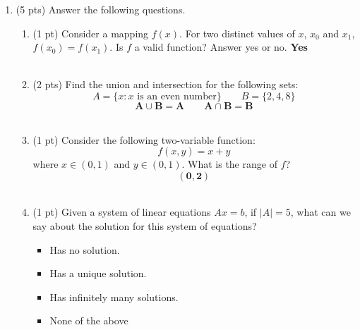 \documentclass{./../../latex/tests}
\begin{document}
\thispagestyle{plain}

\vspace{0.5em}

\begin{enumerate}
\item (5 pts) Answer the following questions. 
\begin{enumerate}
\item (1 pt) Consider a mapping $f(x)$. For two distinct values of $x$, $x_0$ and $x_1$, $f(x_0) = f(x_1)$. Is $f$ a valid function? Answer yes or no. \textbf{Yes} \\~\\
\item (2 pts) Find the union and intersection for the following sets:
\[ A = \{x: x \text{ is an even number} \} \quad \quad B = \{2, 4, 8 \} \] 
\[\mathbf{ A \cup B = A \quad \quad A \cap B = B }\] \\
\item (1 pt) Consider the following two-variable function: 
  \[ f(x,y) = x+y \]
  where $x \in (0,1)$ and $y \in (0,1)$. What is the range of $f$? \[\mathbf{(0,2)}\] \\
 
\item (1 pt) Given a system of linear equations $A x = b$, if $|A|=5$, what can we say about the solution for this system of equations?
\begin{itemize}
	\item[$\square$] Has no solution. 
	\item[$\text{\rlap{$\surd$}}\square$] Has a unique solution.
	\item[$\square$] Has infinitely many solutions.
	\item[$\square$] None of the above \\~\\
\end{itemize}  
\end{enumerate} 


\end{enumerate}
\end{document}
